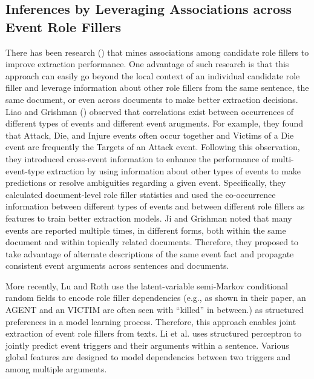 \subsection{Inferences by Leveraging Associations across Event Role Fillers}

There has been research (\cite{liao10,Ji08,Lu2012}) that mines 
associations among candidate role fillers 
to improve extraction performance. 
One advantage of such research is that 
this approach 
can 
easily go beyond 
the local context of an individual candidate role filler 
and leverage information 
about other role fillers 
from the same sentence, the same document, or even across documents 
to make better extraction decisions.
Liao and Grishman (\cite{liao10}) 
observed that correlations exist between occurrences of
different types of events and different event arugments. 
For example, they found that Attack, Die, and Injure events often occur together 
and Victims of a Die event are frequently
 the Targets of an Attack event. 
 Following this observation, they 
introduced cross-event information to enhance 
the performance of multi-event-type extraction 
by
using 
information about other types of events to 
make predictions or resolve ambiguities 
regarding a given event.
Specifically, they calculated
document-level role filler statistics and used the
co-occurrence information between different types of events and 
between different role
fillers as features to train better extraction models. 
Ji and Grishman \cite{Ji08} 
noted that 
many events are
reported multiple times, in different forms, both 
within the same document and within topically 
related documents. 
Therefore, they 
proposed to 
take advantage of alternate descriptions 
of the same event fact and 
propagate
consistent event arguments across sentences 
and documents. 

More recently, Lu and Roth \cite{Lu2012}
use the latent-variable semi-Markov 
conditional random fields 
to encode role filler dependencies 
(e.g., as shown in their paper, 
an AGENT and an VICTIM are often seen with ``killed'' in between.)
as structured preferences in a model learning process.  
Therefore, this approach enables joint extraction of event role fillers from texts.
Li et al. \cite{Li13} uses structured perceptron to jointly 
predict event triggers and their arguments within a sentence. 
Various global features are designed to model dependencies 
between two triggers and among multiple arguments.

